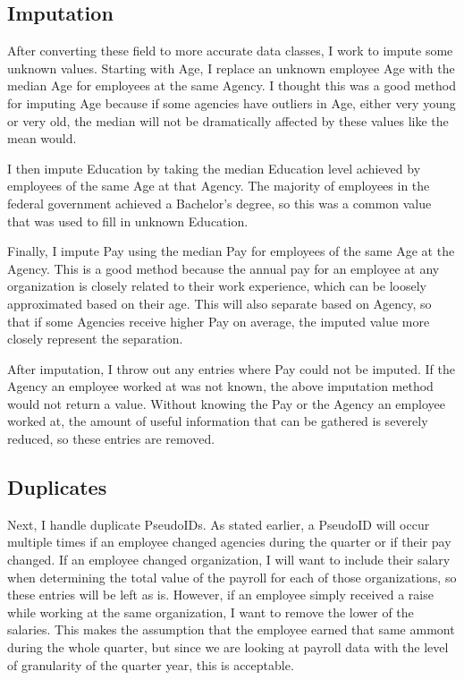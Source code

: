 \documentclass{article}
\begin{document}
    \subsection{Imputation}
    After converting these field to more accurate data classes, I work to impute some unknown values. Starting with Age, I replace an unknown employee Age with the median Age for employees at the same Agency. I thought this was a good method for imputing Age because if some agencies have outliers in Age, either very young or very old, the median will not be dramatically affected by these values like the mean would.
    \par
    I then impute Education by taking the median Education level achieved by employees of the same Age at that Agency. The majority of employees in the federal government achieved a Bachelor's degree, so this was a common value that was used to fill in unknown Education.
    \par
    Finally, I impute Pay using the median Pay for employees of the same Age at the Agency. This is a good method because the annual pay for an employee at any organization is closely related to their work experience, which can be loosely approximated based on their age. This will also separate based on Agency, so that if some Agencies receive higher Pay on average, the imputed value more closely represent the separation.
    \par
    After imputation, I throw out any entries where Pay could not be imputed. If the Agency an employee worked at was not known, the above imputation method would not return a value. Without knowing the Pay or the Agency an employee worked at, the amount of useful information that can be gathered is severely reduced, so these entries are removed.

    \subsection{Duplicates}
    Next, I handle duplicate PseudoIDs. As stated earlier, a PseudoID will occur multiple times if an employee changed agencies during the quarter or if their pay changed. If an employee changed organization, I will want to include their salary when determining the total value of the payroll for each of those organizations, so these entries will be left as is. However, if an employee simply received a raise while working at the same organization, I want to remove the lower of the salaries. This makes the assumption that the employee earned that same ammont during the whole quarter, but since we are looking at payroll data with the level of granularity of the quarter year, this is acceptable.
\end{document}

